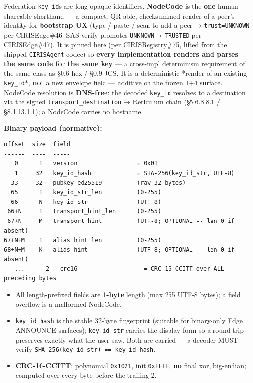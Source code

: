 \documentclass[11pt]{article}
\begin{document}
Federation \texttt{key\_id}s are long opaque identifiers. \textbf{NodeCode} is the \textbf{one} human-shareable shorthand — a compact, QR-able, checksummed render of a peer's identity for \textbf{bootstrap UX} (type / paste / scan to add a peer → \texttt{trust=UNKNOWN} per CIRISEdge\#46; SAS-verify promotes \texttt{UNKNOWN → TRUSTED} per CIRISEdge\#47). It is pinned here (per CIRISRegistry\#75, lifted from the shipped \texttt{CIRISAgent} codec) so \textbf{every implementation renders and parses the same code for the same key} — a cross-impl determinism requirement of the same class as §0.6 hex / §0.9 JCS. It is a deterministic *render of an existing \texttt{key\_id}*, \textbf{not} a new envelope field — additive on the frozen 1+4 surface. NodeCode resolution is \textbf{DNS-free}: the decoded \texttt{key\_id} resolves to a destination via the signed \texttt{transport\_destination} → Reticulum chain (§5.6.8.8.1 / §8.1.13.1.1); a NodeCode carries no hostname.


\textbf{Binary payload (normative):}


\begin{lstlisting}
offset  size  field
------  ----  -----
   0      1   version                 = 0x01
   1     32   key_id_hash             = SHA-256(key_id_str, UTF-8)
  33     32   pubkey_ed25519          (raw 32 bytes)
  65      1   key_id_str_len          (0-255)
  66      N   key_id_str              (UTF-8)
 66+N     1   transport_hint_len      (0-255)
 67+N     M   transport_hint          (UTF-8; OPTIONAL -- len 0 if absent)
67+N+M    1   alias_hint_len          (0-255)
68+N+M    K   alias_hint              (UTF-8; OPTIONAL -- len 0 if absent)
   ...      2   crc16                   = CRC-16-CCITT over ALL preceding bytes
\end{lstlisting}

\begin{itemize}\setlength\itemsep{0pt}
\item All length-prefixed fields are \textbf{1-byte} length (max 255 UTF-8 bytes); a field overflow is a malformed NodeCode.
\item \texttt{key\_id\_hash} is the stable 32-byte fingerprint (suitable for binary-only Edge ANNOUNCE surfaces); \texttt{key\_id\_str} carries the display form so a round-trip preserves exactly what the user saw. Both are carried — a decoder MUST verify \texttt{SHA-256(key\_id\_str) == key\_id\_hash}.
\item \textbf{CRC-16-CCITT}: polynomial \texttt{0x1021}, init \texttt{0xFFFF}, \textbf{no} final xor, big-endian; computed over every byte before the trailing 2.
\end{itemize}
\end{document}
